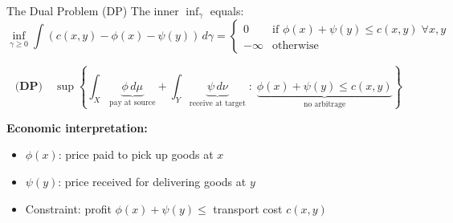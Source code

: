 \documentclass[aspectratio=169]{beamer}
\begin{document}
\begin{frame}{The Dual Problem (DP)}
The inner $\inf_\gamma$ equals:
\[
\inf_{\gamma \geq 0} \int (c(x,y) - \phi(x) - \psi(y)) \, d\gamma =
\begin{cases}
0 & \text{if } \phi(x) + \psi(y) \leq c(x,y) \; \forall x,y \\
-\infty & \text{otherwise}
\end{cases}
\]

\vspace{0.3cm}
\[
\boxed{\textbf{(DP)} \quad \sup \left\{ \int_X \underbrace{\phi \, d\mu}_{\text{pay at source}} + \int_Y \underbrace{\psi \, d\nu}_{\text{receive at target}} \;:\; \underbrace{\phi(x) + \psi(y) \leq c(x,y)}_{\text{no arbitrage}} \right\}}
\]

\vspace{0.4cm}
\textbf{Economic interpretation:}
\begin{itemize}
    \item $\phi(x)$: price paid to pick up goods at $x$
    \item $\psi(y)$: price received for delivering goods at $y$
    \item Constraint: profit $\phi(x) + \psi(y) \leq$ transport cost $c(x,y)$
\end{itemize}
\end{frame}
\end{document}
